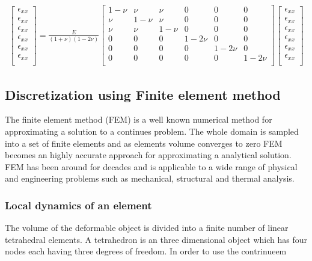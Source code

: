 \documentclass[10pt,a4paper]{article}
\begin{document}
\begin{eqnarray}\label{sju}
\left[ \begin{array}{c}
\epsilon_{xx} \\
\epsilon_{xx} \\
\epsilon_{xx} \\
\epsilon_{xx} \\
\epsilon_{xx} \\
\epsilon_{xx} \\
\end{array} \right] = \frac{E}{(1+\nu)(1-2\nu)}
\left[ \begin{array}{cccccc}
1-\nu & \nu & \nu & 0 & 0 & 0\\
\nu & 1-\nu & \nu & 0 & 0 & 0\\
\nu & \nu & 1-\nu & 0 & 0 & 0\\
0 & 0 & 0 & 1-2\nu & 0 & 0\\
0 & 0 & 0 & 0 & 1-2\nu & 0\\
0 & 0 & 0 & 0 & 0 & 1-2\nu\\
 \end{array} \right]
\left[ \begin{array}{c}
\epsilon_{xx} \\
\epsilon_{xx} \\
\epsilon_{xx} \\
\epsilon_{xx} \\
\epsilon_{xx} \\
\epsilon_{xx} \\
\end{array} \right]
\end{eqnarray}



\subsection{Discretization using Finite element method}
The finite element method (FEM) is a well known numerical method for approximating a solution to a continues problem. The whole domain is sampled into a set of finite elements and as elements volume converges to zero FEM becomes an highly accurate approach for approximating a analytical solution. FEM has been around for decades and is applicable to a wide range of physical and engineering problems such as mechanical, structural and thermal analysis.

\subsubsection{Local dynamics of an element}
The volume of the deformable object is divided into a finite number of linear tetrahedral elements. A tetrahedron is an three dimensional object which has four nodes each having three degrees of freedom. In order to use the contrinueem  
\end{document}
